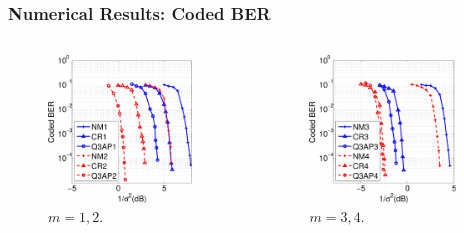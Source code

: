 \documentclass{beamer}
\begin{document}
\begin{frame}
  \frametitle{Numerical Results: Coded BER}
  \begin{columns}
    \begin{figure}
      \includegraphics[width=0.9\textwidth]{figs/waterfall_2M3M_64QAM_Q3AP.pdf}
      \caption{$m=1,2$.}
    \end{figure}
    
    \begin{figure}
      \includegraphics[width=0.9\textwidth]{figs/waterfall_4M5M_64QAM_Q3AP.pdf}
      \caption{$m=3,4$.}
    \end{figure}
  \end{columns}
\end{frame}
\end{document}
